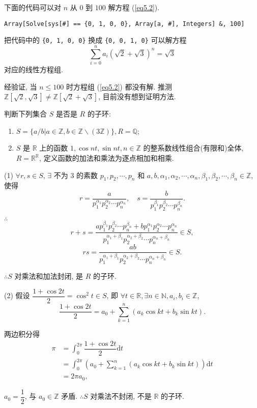 \documentclass[color=black,device=normal,lang=cn,mode=geye]{elegantnote}
\begin{document}
\begin{solution}
    下面的代码可以对 $n$ 从 $0$ 到 $100$ 解方程 (\ref{eq5.2}).
    \begin{verbatim}
Array[Solve[sys[#] == {0, 1, 0, 0}, Array[a, #], Integers] &, 100]\end{verbatim}

    把代码中的 \verb|{0, 1, 0, 0}| 换成 \verb|{0, 0, 1, 0}| 可以解方程
    \[\sum\limits_{i=0}^na_i(\sqrt{2}+\sqrt{3})^n=\sqrt{3}\]
    对应的线性方程组.

    经验证, 当 $n\leq 100$ 时方程组 (\ref{eq5.2}) 都没有解. 推测 $\mathbb{Z}[\sqrt{2},\sqrt{3}]\neq\mathbb{Z}[\sqrt{2}+\sqrt{3}]$, 目前没有想到证明方法.
\end{solution}
\begin{exercisec}[5.3.4]
    判断下列集合 $S$ 是否是 $R$ 的子环:
    \begin{enumerate}
        \def\labelenumi{(\arabic{enumi})}
        \item $S=\{a/b|a\in\mathbb{Z},b\in\mathbb{Z}\backslash(3\mathbb{Z})\},R=\mathbb{Q}$;
        \item $S$ 是 $\mathbb{R}$ 上的函数 $1,\cos nt,\sin nt,n\in\mathbb{Z}$ 的整系数线性组合(有限和)全体, $R=\mathbb{R}^\mathbb{R}$, 定义函数的加法和乘法为逐点相加和相乘.
    \end{enumerate}
\end{exercisec}
\begin{solution}
    (1) $\forall r,s\in S$, $\exists$ 不为 $3$ 的素数 $p_1,p_2,\cdots,p_n$ 和 $a,b,\alpha_1,\alpha_2,\cdots,\alpha_n,\beta_1,\beta_2,\cdots,\beta_n\in\mathbb{Z}$, 使得
    \[r=\dfrac{a}{p_1^{\alpha_1}p_2^{\alpha_2}\cdots p_n^{\alpha_n}},\quad s=\dfrac{b}{p_1^{\beta_1}p_2^{\beta_2}\cdots p_n^{\beta_n}}.\]

    $\therefore$
    \[r+s=\dfrac{ap_1^{\beta_1}p_2^{\beta_2}\cdots p_n^{\beta_n}+bp_1^{\alpha_1}p_2^{\alpha_2}\cdots p_n^{\alpha_n}}{p_1^{\alpha_1+\beta_1}p_2^{\alpha_2+\beta_2}\cdots p_n^{\alpha_n+\beta_n}}\in S,\]
    \[rs=\dfrac{ab}{p_1^{\alpha_1+\beta_1}p_2^{\alpha_2+\beta_2}\cdots p_n^{\alpha_n+\beta_n}}\in S.\]

    $\therefore S$ 对乘法和加法封闭, 是 $R$ 的子环.

    (2) 假设 $\dfrac{1+\cos2t}{2}=\cos^2t\in S$, 即 $\forall t\in\mathbb{R},\exists n\in\mathbb{N},a_i,b_i\in\mathbb{Z}$,
    \[\dfrac{1+\cos2t}{2}=a_0+\sum\limits_{k=1}^n(a_k\cos kt+b_k\sin kt).\]

    两边积分得
    \begin{align*}
        \pi & =\int_0^{2\pi}\dfrac{1+\cos2t}{2}\mathrm{d}t \\
        & =\int_0^{2\pi}\left(a_0+\sum\limits_{k=1}^n(a_k\cos kt+b_k\sin kt)\right)\mathrm{d}t \\
        & =2\pi a_0,
    \end{align*}

    $a_0=\dfrac{1}{2}$, 与 $a_0\in\mathbb{Z}$ 矛盾. $\therefore S$ 对乘法不封闭, 不是 $\mathbb{R}$ 的子环.
\end{solution}
\end{document}
